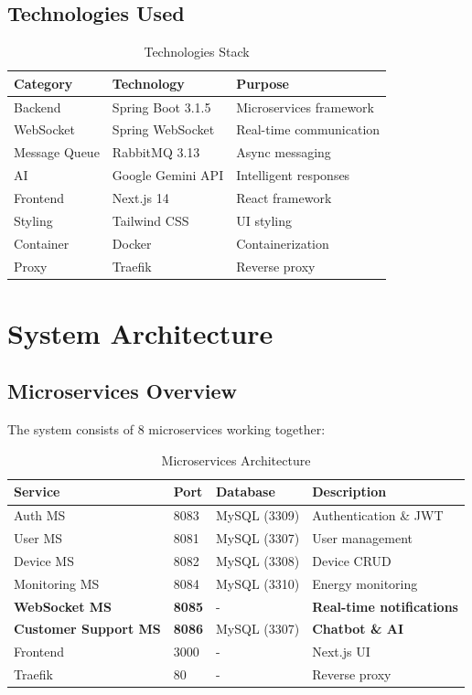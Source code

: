 \documentclass[12pt,a4paper]{article}
\begin{document}
\subsection{Technologies Used}
\begin{table}[H]
\centering
\begin{tabular}{|l|l|l|}
\hline
\textbf{Category} & \textbf{Technology} & \textbf{Purpose} \\
\hline
Backend & Spring Boot 3.1.5 & Microservices framework \\
WebSocket & Spring WebSocket & Real-time communication \\
Message Queue & RabbitMQ 3.13 & Async messaging \\
AI & Google Gemini API & Intelligent responses \\
Frontend & Next.js 14 & React framework \\
Styling & Tailwind CSS & UI styling \\
Container & Docker & Containerization \\
Proxy & Traefik & Reverse proxy \\
\hline
\end{tabular}
\caption{Technologies Stack}
\end{table}

\section{System Architecture}

\subsection{Microservices Overview}
The system consists of 8 microservices working together:

\begin{table}[H]
\centering
\begin{tabular}{|l|l|l|l|}
\hline
\textbf{Service} & \textbf{Port} & \textbf{Database} & \textbf{Description} \\
\hline
Auth MS & 8083 & MySQL (3309) & Authentication \& JWT \\
User MS & 8081 & MySQL (3307) & User management \\
Device MS & 8082 & MySQL (3308) & Device CRUD \\
Monitoring MS & 8084 & MySQL (3310) & Energy monitoring \\
\textbf{WebSocket MS} & \textbf{8085} & - & \textbf{Real-time notifications} \\
\textbf{Customer Support MS} & \textbf{8086} & MySQL (3307) & \textbf{Chatbot \& AI} \\
Frontend & 3000 & - & Next.js UI \\
Traefik & 80 & - & Reverse proxy \\
\hline
\end{tabular}
\caption{Microservices Architecture}
\end{table}
\end{document}
